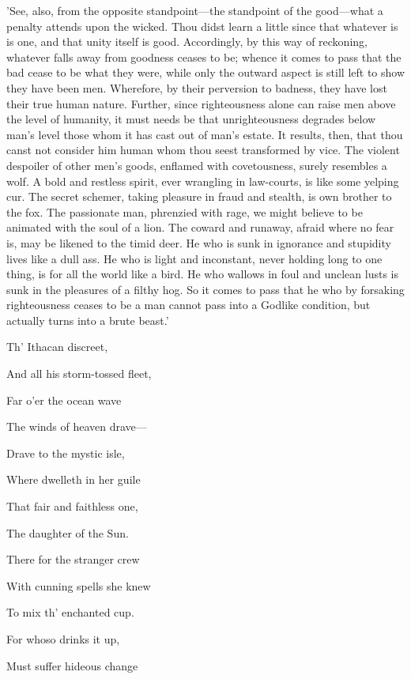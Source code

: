 'See, also, from the opposite standpoint—the standpoint of the
good—what a penalty attends upon the wicked. Thou didst learn a little
since that whatever is is one, and that unity itself is good.
Accordingly, by this way of reckoning, whatever falls away from goodness
ceases to be; whence it comes to pass that the bad cease to be what they
were, while only the outward aspect is still left to show they have been
men. Wherefore, by their perversion to badness, they have lost their
true human nature. Further, since righteousness alone can raise men
above the level of humanity, it must needs be that unrighteousness
degrades below man's level those whom it has cast out of man's estate.
It results, then, that thou canst not consider him human whom thou seest
transformed by vice. The violent despoiler of other men's goods,
enflamed with covetousness, surely resembles a wolf. A bold and restless
spirit, ever wrangling in law-courts, is like some yelping cur. The
secret schemer, taking pleasure in fraud and stealth, is own brother to
the fox. The passionate man, phrenzied with rage, we might believe to be
animated with the soul of a lion. The coward and runaway, afraid where
no fear is, may be likened to the timid deer. He who is sunk in
ignorance and stupidity lives like a dull ass. He who is light and
inconstant, never holding long to one thing, is for all the world like a
bird. He who wallows in foul and unclean lusts is sunk in the pleasures
of a filthy hog. So it comes to pass that he who by forsaking
righteousness ceases to be a man cannot pass into a Godlike condition,
but actually turns into a brute beast.'


Th' Ithacan discreet,

And all his storm-tossed fleet,

Far o'er the ocean wave

The winds of heaven drave—

Drave to the mystic isle,

Where dwelleth in her guile

That fair and faithless one,

The daughter of the Sun.

There for the stranger crew

With cunning spells she knew

To mix th' enchanted cup.

For whoso drinks it up,

Must suffer hideous change


